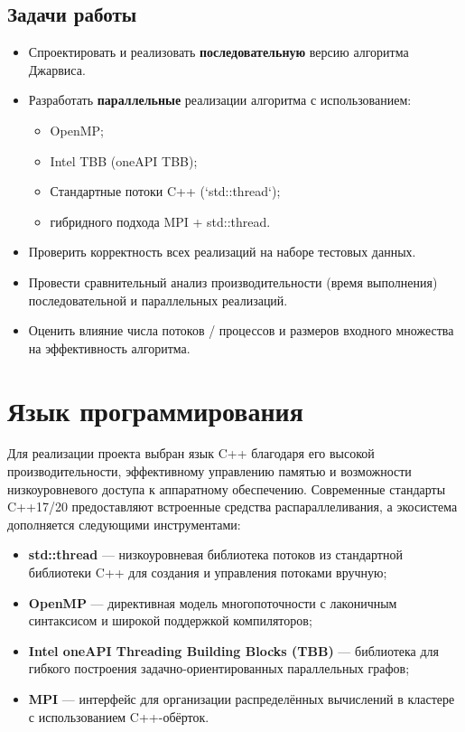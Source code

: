 \documentclass[12pt,a4paper]{article}
\begin{document}
\subsection*{Задачи работы}
\begin{itemize}
    \item Спроектировать и реализовать \textbf{последовательную} версию алгоритма Джарвиса.
    \item Разработать \textbf{параллельные} реализации алгоритма с использованием:
    \begin{itemize}
        \item OpenMP;
        \item Intel TBB (oneAPI TBB);
        \item Стандартные потоки C++ (`std::thread`);
        \item гибридного подхода MPI + std::thread.
    \end{itemize}
    \item Проверить корректность всех реализаций на наборе тестовых данных.
    \item Провести сравнительный анализ производительности (время выполнения) последовательной и параллельных реализаций.
    \item Оценить влияние числа потоков / процессов и размеров входного множества на эффективность алгоритма.
\end{itemize}

\section{Язык программирования}

Для реализации проекта выбран язык C++ благодаря его высокой производительности, эффективному управлению памятью и возможности низкоуровневого доступа к аппаратному обеспечению. Современные стандарты C++17/20 предоставляют встроенные средства распараллеливания, а экосистема дополняется следующими инструментами:

\begin{itemize}
  \item \textbf{std::thread} — низкоуровневая библиотека потоков из стандартной библиотеки C++ для создания и управления потоками вручную;
  \item \textbf{OpenMP} — директивная модель многопоточности с лаконичным синтаксисом и широкой поддержкой компиляторов;
  \item \textbf{Intel oneAPI Threading Building Blocks (TBB)} — библиотека для гибкого построения задачно-ориентированных параллельных графов;
  \item \textbf{MPI} — интерфейс для организации распределённых вычислений в кластере с использованием C++-обёрток.
\end{itemize}
\end{document}
